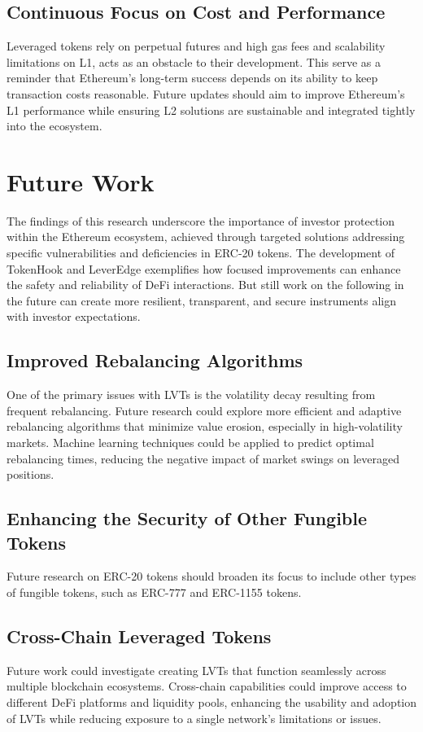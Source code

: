 \subsection{Continuous Focus on Cost and Performance}
Leveraged tokens rely on perpetual futures and high gas fees and scalability limitations on L1, acts as an obstacle to their development. This serve as a reminder that Ethereum’s long-term success depends on its ability to keep transaction costs reasonable. Future updates should aim to improve Ethereum's L1 performance while ensuring L2 solutions are sustainable and integrated tightly into the ecosystem.

\section{Future Work}
The findings of this research underscore the importance of investor protection within the Ethereum ecosystem, achieved through targeted solutions addressing specific vulnerabilities and deficiencies in ERC-20 tokens. The development of TokenHook and LeverEdge exemplifies how focused improvements can enhance the safety and reliability of DeFi interactions. But still work on the following in the future can create more resilient, transparent, and secure instruments align with investor expectations.

\subsection{Improved Rebalancing Algorithms}
One of the primary issues with LVTs is the volatility decay resulting from frequent rebalancing. Future research could explore more efficient and adaptive rebalancing algorithms that minimize value erosion, especially in high-volatility markets. Machine learning techniques could be applied to predict optimal rebalancing times, reducing the negative impact of market swings on leveraged positions.

\subsection{Enhancing the Security of Other Fungible Tokens}
Future research on ERC-20 tokens should broaden its focus to include other types of fungible tokens, such as ERC-777 and ERC-1155 tokens.

\subsection{Cross-Chain Leveraged Tokens}
Future work could investigate creating LVTs that function seamlessly across multiple blockchain ecosystems. Cross-chain capabilities could improve access to different DeFi platforms and liquidity pools, enhancing the usability and adoption of LVTs while reducing exposure to a single network's limitations or issues.

